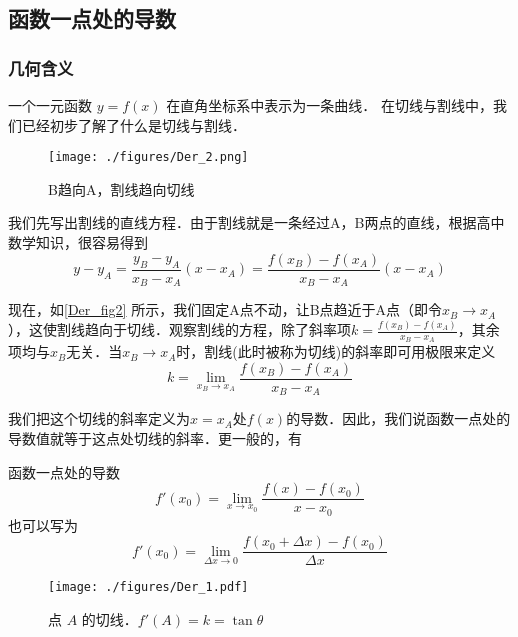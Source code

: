 

\subsection{函数一点处的导数}
\subsubsection{几何含义}
一个一元函数 $y = f(x)$ 在直角坐标系中表示为一条曲线． 在切线与割线中，我们已经初步了解了什么是切线与割线．

\begin{figure}[ht]
\centering
\texttt{[image: ./figures/Der\_2.png]}
\caption{B趋向A，割线趋向切线} \label{Der_fig2}
\end{figure}

我们先写出割线的直线方程．由于割线就是一条经过A，B两点的直线，根据高中数学知识，很容易得到
\begin{equation}
y-y_A=\frac{y_B-y_A}{x_B-x_A}(x-x_A)=\frac{f(x_B)-f(x_A)}{x_B-x_A}(x-x_A)
\end{equation}

现在，如\autoref{Der_fig2} 所示，我们固定A点不动，让B点趋近于A点（即令$x_B\rightarrow x_A$），这使割线趋向于切线．观察割线的方程，除了斜率项$k=\frac{f(x_B)-f(x_A)}{x_B-x_A}$，其余项均与$x_B$无关．当$x_B\rightarrow x_A$时，割线(此时被称为切线)的斜率即可用极限来定义
\begin{equation}
k=\lim_{x_B\to x_A}\frac{f(x_B)-f(x_A)}{x_B-x_A}
\end{equation}

我们把这个切线的斜率定义为$x=x_A$处$f(x)$的导数．因此，我们说函数一点处的导数值就等于这点处切线的斜率．更一般的，有
\begin{definition}{函数一点处的导数}
\begin{equation}
f'(x_0)=\lim_{x\to x_0}\frac{f(x)-f(x_0)}{x-x_0}
\end{equation}
也可以写为
\begin{equation}
f'(x_0)=\lim_{\Delta x\to0}\frac{f(x_0+\Delta x)-f(x_0)}{\Delta x}
\end{equation}
\end{definition}

\begin{figure}[ht]
\centering
\texttt{[image: ./figures/Der\_1.pdf]}
\caption{点 $A$ 的切线．$f'(A)=k=\tan \theta$}
\end{figure}


